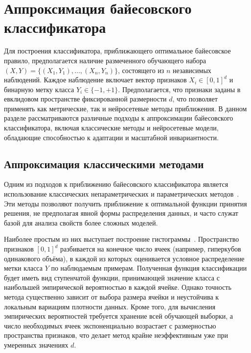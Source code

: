 \section{Аппроксимация байесовского классификатора}\label{sec:ch1/bayesian_classifier_approximation}

Для построения классификатора, приближающего оптимальное байесовское правило, предполагается наличие размеченного обучающего набора \((X, Y) = \{(X_1, Y_1), \dots, (X_n, Y_n)\}\), состоящего из \(n\) независимых наблюдений. Каждое наблюдение включает вектор признаков \(X_i \in [0,1]^d\) и бинарную метку класса \(Y_i \in \{-1, +1\}\). Предполагается, что признаки заданы в евклидовом пространстве фиксированной размерности \(d\), что позволяет применять как метрические, так и нейросетевые методы приближения. В данном разделе рассматриваются различные подходы к аппроксимации байесовского классификатора, включая классические методы и нейросетевые модели, обладающие способностью к адаптации и масштабной инвариантности.


\subsection{Аппроксимация классическими методами}\label{subsec:ch1/classic_approximation}

Одним из подходов к приближению байесовского классификатора является использование классических непараметрических и параметрических методов~\cite{devroye1985nonparametric, hastie2009elements}. Эти методы позволяют получить приближение к оптимальной функции принятия решения, не предполагая явной формы распределения данных, и часто служат базой для анализа свойств более сложных моделей.

Наиболее простым из них выступает построение гистограммы~\cite{devroye1996regular}. Пространство признаков \([0,1]^d\) разбивается на конечное число ячеек (например, гиперкубов одинакового объёма), в каждой из которых оценивается условное распределение метки класса \(Y\) по наблюдаемым примерам. Полученная функция классификации будет иметь вид ступенчатой функции, принимающей значение класса с наибольшей эмпирической вероятностью в каждой ячейке. Однако точность метода существенно зависит от выбора размера ячейки и неустойчива к локальным вариациям плотности данных. Кроме того, для вычисления эмпирических вероятностей требуется хранение всей обучающей выборки, а число необходимых ячеек экспоненциально возрастает с размерностью пространства признаков, что делает метод крайне неэффективным уже при умеренных значениях \(d\).

